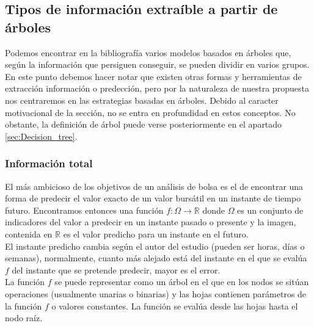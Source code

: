 \subsection{Tipos de informaci\'on extra\'ible a partir de \'arboles}
Podemos encontrar en la bibliograf\'ia varios modelos basados en \'arboles que, seg\'un la informaci\'on que persiguen conseguir, se pueden dividir en varios grupos. En este punto debemos hacer notar que existen otras formas y herramientas de extracci\'on informaci\'on o predecci\'on, pero por la naturaleza de nuestra propuesta nos centraremos en las estrategias basadas en \'arboles. Debido al caracter motivacional de la secci\'on, no se entra en profundidad en estos conceptos. No obstante, la definici\'on de \'arbol puede verse posteriormente en el apartado \ref{sec:Decision_tree}.

    \subsubsection{Informaci\'on total}
    
    El m\'as ambicioso de los objetivos de un an\'alisis de bolsa es el de encontrar una forma de predecir el valor exacto de un valor burs\'atil en un instante de tiempo futuro. Encontramos entonces una funci\'on $f:\Omega \rightarrow \mathbb{R}$ donde $\Omega$ es un conjunto de indicadores del valor a predecir en un instante pasado o presente y la imagen, contenida en $\mathbb{R}$ es el valor predicho para un instante en el futuro.\\
    
    El instante predicho cambia seg\'un el autor del estudio (pueden ser horas, d\'ias o semanas), normalmente, cuanto m\'as alejado est\'a del instante en el que se eval\'ua $f$ del instante que se pretende predecir, mayor es el error.\\
    
    La funci\'on $f$ se puede representar como un \'arbol en el que en los nodos se sit\'uan operaciones (usualmente unarias o binarias) y las hojas contienen par\'ametros de la funci\'on $f$ o valores constantes. La funci\'on se eval\'ua desde las hojas hasta el nodo ra\'iz. \\
    
